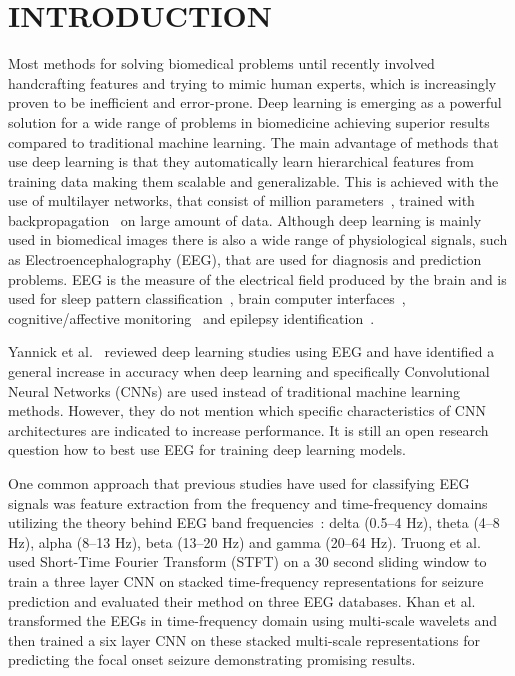 \documentclass[conference]{IEEEtran}
\begin{document}
\section{INTRODUCTION}
Most methods for solving biomedical problems until recently involved
handcrafting features and trying to mimic human experts, which is
increasingly proven to be inefficient and error-prone.
Deep learning is emerging as a powerful solution for a wide range of
problems in biomedicine achieving superior results compared to
traditional machine learning.
The main advantage of methods that use deep learning is that they
automatically learn hierarchical features from training data making
them scalable and generalizable.
This is achieved with the use of multilayer networks, that consist of
million parameters~\cite{krizhevsky2012imagenet}, trained with
backpropagation~\cite{rumelhart1986learning} on large amount of data.
Although deep learning is mainly used in biomedical images there is
also a wide range of physiological signals, such as
Electroencephalography (EEG), that are used for diagnosis and
prediction problems.
EEG is the measure of the electrical field produced by the brain and
is used for sleep pattern classification~\cite{aboalayon2016sleep},
brain computer interfaces~\cite{al2017review}, cognitive/affective
monitoring~\cite{lotte1999electroencephalography} and epilepsy
identification~\cite{acharya2013automated}.

Yannick et al.~\cite{yannick2019deep} reviewed deep learning studies
using EEG and have identified a general increase in accuracy when
deep learning and specifically Convolutional Neural Networks (CNNs)
are used instead of traditional machine learning methods.
However, they do not mention which specific characteristics of CNN
architectures are indicated to increase performance.
It is still an open research question how to best use EEG for
training deep learning models.

One common approach that previous studies have used for classifying
EEG signals was feature extraction from the frequency and
time-frequency domains utilizing the theory behind EEG band
frequencies~\cite{langkvist2012sleep}: delta (0.5--4 Hz), theta (4--8
Hz), alpha (8--13 Hz), beta (13--20 Hz) and gamma (20--64 Hz).
Truong et al.~\cite{truong2018convolutional} used Short-Time Fourier
Transform (STFT) on a 30 second sliding window to train a three layer
CNN on stacked time-frequency representations for seizure prediction
and evaluated their method on three EEG databases.
Khan et al.~\cite{khan2018focal} transformed the EEGs in
time-frequency domain using multi-scale wavelets and then trained a
six layer CNN on these stacked multi-scale representations for
predicting the focal onset seizure demonstrating promising results.
\end{document}

